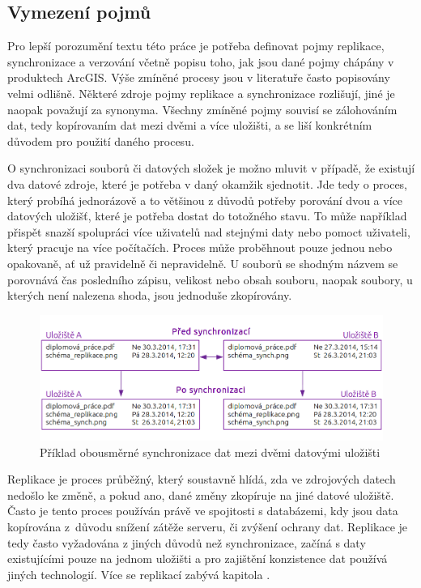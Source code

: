         \subsection{Vymezení pojmů}
        Pro lepší porozumění textu této práce je potřeba definovat pojmy replikace, synchronizace a verzování včetně popisu toho, jak jsou dané pojmy chápány v produktech ArcGIS. Výše zmíněné procesy jsou v literatuře často popisovány velmi odlišně. Některé zdroje pojmy replikace a synchronizace rozlišují, jiné je naopak považují za synonyma. Všechny zmíněné pojmy souvisí se zálohováním dat, tedy kopírovaním dat mezi dvěmi a více uložišti, a se liší konkrétním důvodem pro použití daného procesu. 

O synchronizaci souborů či datových složek je možno mluvit v případě, že existují dva datové zdroje, které je potřeba v daný okamžik sjednotit. Jde tedy o proces, který probíhá jednorázově a to většinou z důvodů potřeby porování dvou a více datových uložišť, které je potřeba dostat do totožného stavu. To může například přispět snazší spolupráci více uživatelů nad stejnými daty nebo pomoct uživateli, který pracuje na více počítačích. Proces může proběhnout pouze jednou nebo opakovaně, ať už pravidelně či nepravidelně. U souborů se shodným názvem se porovnává čas posledního zápisu, velikost nebo obsah souboru, naopak soubory, u kterých není nalezena shoda, jsou jednoduše zkopírovány. 

          \begin{figure}[H]
            \centering
            \includegraphics[scale=1]{../../../grafy/obr/schema_synchronizace_maxiTence.png}
            \caption {Příklad obousměrné synchronizace dat mezi dvěmi datovými uložišti}
          \end{figure}

Replikace je proces průběžný, který soustavně hlídá, zda ve zdrojových datech nedošlo ke změně, a pokud ano, dané změny zkopíruje na jiné datové uložiště. Často je tento proces používán právě ve spojitosti s databázemi, kdy jsou data kopírována z~důvodu snížení zátěže serveru, či zvýšení ochrany dat. Replikace je tedy často vyžadována z jiných důvodů než synchronizace, začíná s daty existujícími pouze na jednom uložišti a pro zajištění konzistence dat používá jiných technologií. Více se replikací zabývá kapitola .

